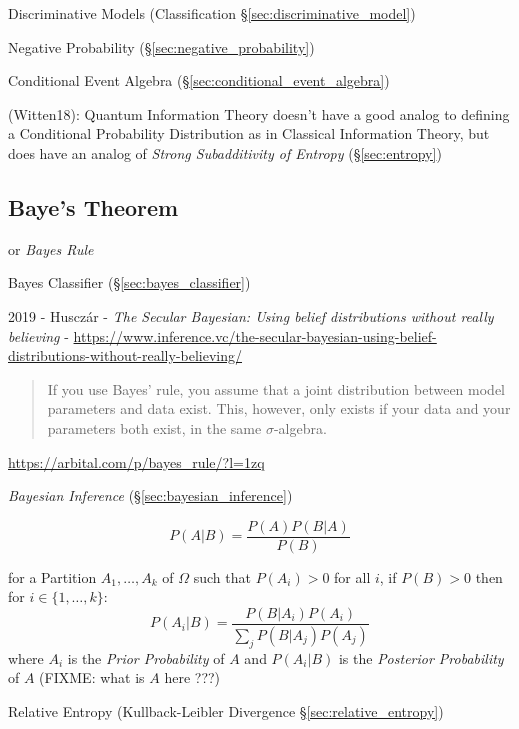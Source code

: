 \fist Discriminative Models (Classification \S\ref{sec:discriminative_model})

\fist Negative Probability (\S\ref{sec:negative_probability})

\fist Conditional Event Algebra (\S\ref{sec:conditional_event_algebra})

(Witten18): Quantum Information Theory doesn't have a good analog to defining a
Conditional Probability Distribution as in Classical Information Theory, but
does have an analog of \emph{Strong Subadditivity of Entropy}
(\S\ref{sec:entropy})



\subsection{Baye's Theorem}\label{sec:bayes_theorem}

or \emph{Bayes Rule}

\fist Bayes Classifier (\S\ref{sec:bayes_classifier})

2019 - Huscz\'ar -
\emph{The Secular Bayesian: Using belief distributions without really believing} -
\url{https://www.inference.vc/the-secular-bayesian-using-belief-distributions-without-really-believing/}

\begin{quote}
  If you use Bayes' rule, you assume that a joint distribution between model
  parameters and data exist. This, however, only exists if your data and your
  parameters both exist, in the same $\sigma$-algebra.
\end{quote}

\url{https://arbital.com/p/bayes_rule/?l=1zq}

\emph{Bayesian Inference} (\S\ref{sec:bayesian_inference})

\[
  P(A|B) = \frac{P(A)P(B|A)}{P(B)}
\]

for a Partition $A_1, \ldots, A_k$ of $\Omega$ such that $P(A_i) > 0$ for all
$i$, if $P(B) > 0$ then for $i \in \{1, \ldots, k\}$:
\[
  P(A_i|B) = \frac{
    P(B|A_i)P(A_i)
  }{
    \sum_j P(B|A_j)P(A_j)
  }
\]
where $A_i$ is the \emph{Prior Probability} of $A$ and $P(A_i|B)$ is the
\emph{Posterior Probability} of $A$ (FIXME: what is $A$ here ???)

\fist Relative Entropy (Kullback-Leibler Divergence
\S\ref{sec:relative_entropy})



